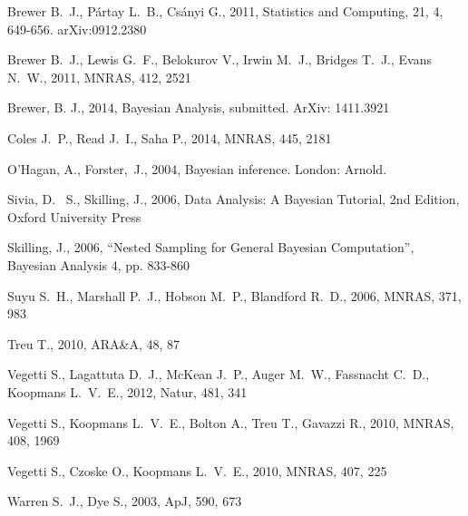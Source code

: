 \documentclass[useAMS,usenatbib]{mn2e}
\begin{document}
\begin{thebibliography}{99}
 Brewer B.~J., P{\'a}rtay L.~B., Cs{\'a}nyi G., 2011,
Statistics and Computing, 21, 4, 649-656. arXiv:0912.2380

Brewer B.~J., Lewis G.~F., Belokurov V., Irwin M.~J., Bridges T.~J., Evans 
N.~W., 2011, MNRAS, 412, 2521

 Brewer, B. J., 2014,
Bayesian Analysis, submitted. ArXiv: 1411.3921

 Coles J.~P., Read J.~I., Saha P., 2014, MNRAS, 445, 2181

O'Hagan, A., Forster,~J., 2004, Bayesian inference. London: Arnold.

 Sivia, 
D.~ S., Skilling, J., 2006, Data Analysis: A Bayesian Tutorial, 2nd 
Edition, Oxford University Press

 Skilling, 
J., 2006, ``Nested Sampling for General Bayesian Computation'', Bayesian 
Analysis 4, pp. 833-860

Suyu S.~H., Marshall P.~J., Hobson M.~P., Blandford R.~D., 2006, MNRAS, 
371, 983

 Treu T., 2010, ARA\&A, 48, 87 

 Vegetti S., Lagattuta D.~J., McKean J.~P., 
Auger M.~W., Fassnacht C.~D., Koopmans L.~V.~E., 2012, Natur, 481, 341 

 Vegetti S., Koopmans L.~V.~E., Bolton A., 
Treu T., Gavazzi R., 2010, MNRAS, 408, 1969 

 Vegetti S., Czoske O., Koopmans L.~V.~E., 2010, MNRAS, 407, 225

 Warren S.~J., Dye S., 2003, ApJ, 590, 673
\end{thebibliography}
\end{document}
